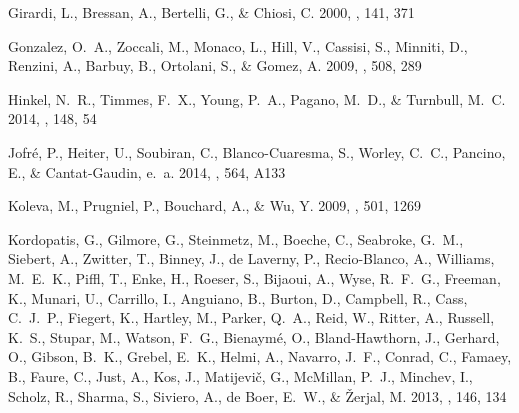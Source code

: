 \documentclass[12pt, preprint]{aastex}
\begin{document}
\begin{thebibliography}{24}
{Girardi}, L., {Bressan}, A., {Bertelli}, G., \& {Chiosi}, C. 2000, \aaps, 141,
  371

{Gonzalez}, O.~A., {Zoccali}, M., {Monaco}, L., {Hill}, V., {Cassisi}, S.,
  {Minniti}, D., {Renzini}, A., {Barbuy}, B., {Ortolani}, S., \& {Gomez}, A.
  2009, \aap, 508, 289

{Hinkel}, N.~R., {Timmes}, F.~X., {Young}, P.~A., {Pagano}, M.~D., \&
  {Turnbull}, M.~C. 2014, \aj, 148, 54

{Jofr{\'e}}, P., {Heiter}, U., {Soubiran}, C., {Blanco-Cuaresma}, S., {Worley},
  C.~C., {Pancino}, E., \& {Cantat-Gaudin}, e.~a. 2014, \aap, 564, A133
  
  
{Koleva}, M., {Prugniel}, P., {Bouchard}, A., \& {Wu}, Y. 2009, \aap, 501, 1269


{Kordopatis}, G., {Gilmore}, G., {Steinmetz}, M., {Boeche}, C., {Seabroke},
  G.~M., {Siebert}, A., {Zwitter}, T., {Binney}, J., {de Laverny}, P.,
  {Recio-Blanco}, A., {Williams}, M.~E.~K., {Piffl}, T., {Enke}, H., {Roeser},
  S., {Bijaoui}, A., {Wyse}, R.~F.~G., {Freeman}, K., {Munari}, U., {Carrillo},
  I., {Anguiano}, B., {Burton}, D., {Campbell}, R., {Cass}, C.~J.~P.,
  {Fiegert}, K., {Hartley}, M., {Parker}, Q.~A., {Reid}, W., {Ritter}, A.,
  {Russell}, K.~S., {Stupar}, M., {Watson}, F.~G., {Bienaym{\'e}}, O.,
  {Bland-Hawthorn}, J., {Gerhard}, O., {Gibson}, B.~K., {Grebel}, E.~K.,
  {Helmi}, A., {Navarro}, J.~F., {Conrad}, C., {Famaey}, B., {Faure}, C.,
  {Just}, A., {Kos}, J., {Matijevi{\v c}}, G., {McMillan}, P.~J., {Minchev},
  I., {Scholz}, R., {Sharma}, S., {Siviero}, A., {de Boer}, E.~W., \& {{\v
  Z}erjal}, M. 2013, \aj, 146, 134


\end{thebibliography}
\end{document}
